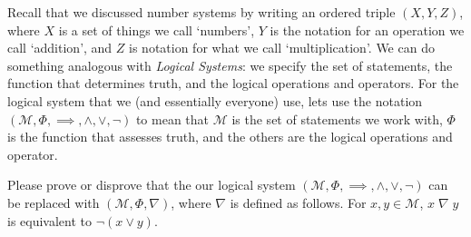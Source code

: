 \documentclass{article}
\begin{document}
 Recall that we discussed number systems by writing an ordered triple $(X, Y, Z)$, where $X$ is a set of things we call `numbers',
$Y$ is the notation for an operation we call `addition', and $Z$ is notation for what we call `multiplication'.
We can do something analogous with \emph{Logical Systems}: we specify the set of statements, the function that determines truth, and the
logical operations and operators.  For the logical system that we (and essentially everyone) use, lets use the notation
$(\mathcal{M}, \Phi, \implies, \wedge, \vee, \neg)$ to mean that $\mathcal{M}$ is the set of statements we work with,
$\Phi$ is the function that assesses truth, and the others are the logical operations and operator.

\vspace{0.1in}\noindent Please prove or disprove that the our logical system $(\mathcal{M}, \Phi, \implies, \wedge, \vee, \neg)$ can be replaced with
$(\mathcal{M}, \Phi, \nabla)$, where $\nabla$ is defined as follows.  For $x, y \in \mathcal{M}$, $x \; \nabla\;y$ is equivalent to
$\neg(x \vee y)$.
\end{document}
